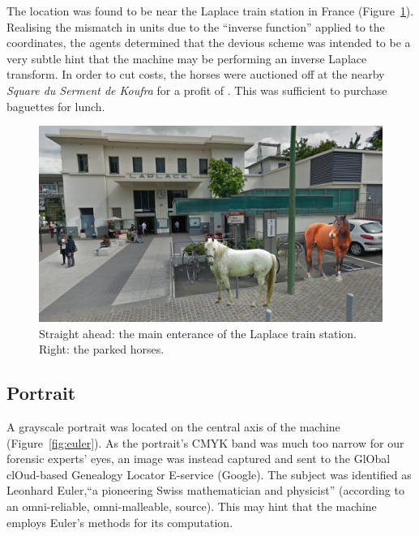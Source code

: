 The location was found to be near the Laplace train station in France (Figure~\ref{fig:laplace-horses}). Realising the mismatch in units due to the ``inverse function'' applied to the coordinates, the agents determined that the devious scheme was intended to be a very subtle hint that the machine may be performing an inverse Laplace transform. In order to cut costs, the horses were auctioned off at the nearby \emph{Square du Serment de Koufra} for a profit of . This was sufficient to purchase baguettes for lunch.

\begin{figure}[h]
	\centering
	\includegraphics[width=0.8\columnwidth]{img/laplace-horses.jpg}
	\caption{Straight ahead: the main enterance of the Laplace train station. Right: the parked horses.}
	\label{fig:laplace-horses}
\end{figure}



\subsection{Portrait}
\newcommand{\google}{\textcolor{google-blue}{G}\textcolor{google-red}{o}\textcolor{google-yellow}{o}\textcolor{google-blue}{g}\textcolor{google-green}{l}\textcolor{google-red}{e}}

A grayscale portrait was located on the central axis of the machine (Figure~\ref{fig:euler}). As the portrait's CMYK band was much too narrow for our forensic experts' eyes, an image was instead captured and sent to the \textcolor{google-blue}{G}l\textcolor{google-red}{O}bal cl\textcolor{google-yellow}{O}ud-based \textcolor{google-blue}{G}enealogy \textcolor{google-green}{L}ocator \textcolor{google-red}{E}-service (\google). The subject was identified as Leonhard Euler,``a pioneering Swiss mathematician and physicist'' (according to an omni-reliable, omni-malleable, source). This may hint that the machine employs Euler's methods for its computation.

